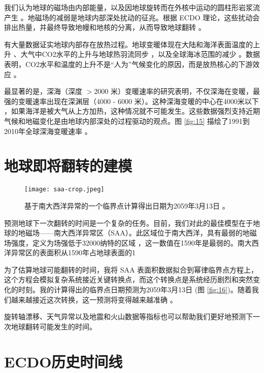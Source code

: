 \documentclass[10pt,twocolumn,letterpaper]{article}
\begin{document}
我们认为地球的磁场由内部能量，以及因地球旋转而在外核中运动的圆柱形岩浆流产生 \cite{123}。地磁场的减弱是地球内部深处扰动的征兆。根据 ECDO 理论，这些扰动会排出热量，并最终导致地幔和地核的分离，从而导致地球翻转 \cite{1}。

有大量数据证实地球内部存在放热过程。地球变暖体现在大陆和海洋表面温度的上升 \cite{127,128}、大气中CO2水平的上升与地球热羽流同步 \cite{129,130}，以及全球海冰范围的减少 \cite{131}。数据表明，CO2水平和温度的上升不是“人为”气候变化的原因，而是放热核心的下游效应 \cite{129}。

最显著的是，深海（深度 $>$2000 米）变暖速率的研究表明，不仅深海在变暖，最强的变暖速率出现在深渊层（4000 - 6000 米）。这种深海变暖的中心在4000米以下 \cite{132,129}，如果海洋是被大气从上方加热，这种情况就不可能发生。这些数据强烈支持近期气候和地磁变化是由地球内部深处的过程驱动的观点。图 \ref{fig:15} 描绘了1991到2010年全球深海变暖速率 \cite{132}。

\section{地球即将翻转的建模}

\begin{figure}[b]
\begin{center}
   \texttt{[image: saa-crop.jpeg]}
\end{center}
   \caption{基于南大西洋异常的一个临界点计算得出日期为2059年3月13日 \cite{125,126}。}
\label{fig:16}
\label{fig:onecol}
\end{figure}

预测地球下一次翻转的时间是一个复杂的任务。目前，我们对此的最佳模型在于地球的地磁场——南大西洋异常区（SAA）。此区域位于南大西洋，具有最弱的地磁场强度，定义为场强低于32000纳特的区域 \cite{135}，这一数值在1590年是最弱的。南大西洋异常区的表面积从1590年占地球表面的1%

为了估算地球可能翻转的时间，我将 SAA 表面积数据拟合到幂律临界点方程上，这个方程会模拟复杂系统接近关键转换点，而这个转换点是系统经历剧烈和突然变化的时刻。我的计算得出的临界点日期预测为2059年3月13日 (图 \ref{fig:16})。随着我们越来越接近这次转换，这一预测将变得越来越准确 \cite{136}。

旋转轴漂移、天气异常以及地震和火山数据等指标也可以帮助我们更好地预测下一次地球翻转可能发生的时间。

\section{ECDO历史时间线}
\end{document}
